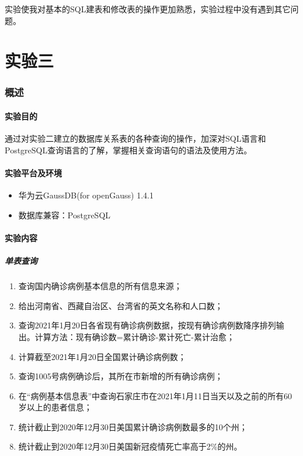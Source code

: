 \documentclass[lang=cn,11pt,a4paper,cite=authornum]{paper}
\begin{document}
实验使我对基本的SQL建表和修改表的操作更加熟悉，实验过程中没有遇到其它问题。

\part{实验三}

\section{概述}

\subsection{实验目的}

通过对实验二建立的数据库关系表的各种查询的操作，加深对SQL语言和PostgreSQL查询语言的了解，掌握相关查询语句的语法及使用方法。

\subsection{实验平台及环境}

\begin{itemize}
    \item 华为云GaussDB(for openGauss) 1.4.1
    \item 数据库兼容：PostgreSQL
\end{itemize}

\subsection{实验内容}

\subsubsection{单表查询}

\begin{enumerate}
    \item 查询国内确诊病例基本信息的所有信息来源；
    \item 给出河南省、西藏自治区、台湾省的英文名称和人口数；
    \item 查询2021年1月20日各省现有确诊病例数据，按现有确诊病例数降序排列输出。计算方法：现有确诊数=累计确诊-累计死亡-累计治愈；
    \item 计算截至2021年1月20日全国累计确诊病例数；
    \item 查询1005号病例确诊后，其所在市新增的所有确诊病例；
    \item 在“病例基本信息表”中查询石家庄市在2021年1月11日当天以及之前的所有60岁以上的患者信息；
    \item 统计截止到2020年12月30日美国累计确诊病例数最多的10个州；
    \item 统计截止到2020年12月30日美国新冠疫情死亡率高于2\%的州。
\end{enumerate}
\end{document}
